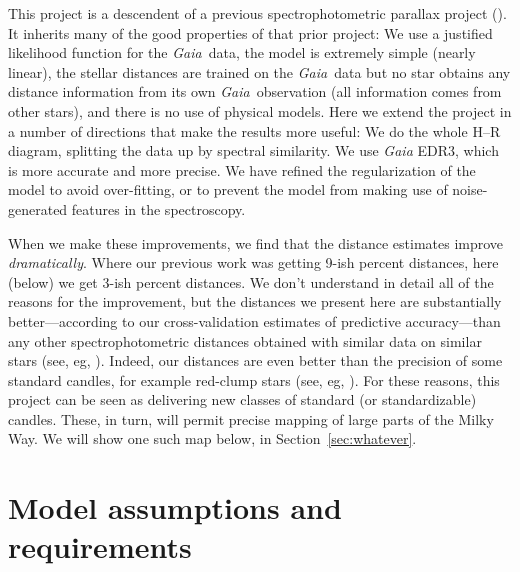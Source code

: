 \documentclass[modern]{aastex631}
\newcommand{\sectionname}{Section}
\newcommand{\acronym}[1]{{\small{#1}}}
\newcommand{\project}[1]{\textsl{#1}}
\newcommand{\Gaia}{\project{Gaia}}
\begin{document}
This project is a descendent of a previous spectrophotometric parallax project
(\citealt{her}).
It inherits many of the good properties of that prior project:
We use a justified likelihood function for the \Gaia\ data,
the model is extremely simple (nearly linear),
the stellar distances are trained on the \Gaia\ data but no star obtains
any distance information from its own \Gaia\ observation (all information
comes from other stars),
and there is no use of physical models.
Here we extend the project in a number of directions that make the results
more useful:
We do the whole H--R diagram, splitting the data up by spectral similarity.
We use \Gaia{} \acronym{EDR3}, which is more accurate and more precise.
We have refined the regularization of the model to avoid over-fitting, or to prevent
the model from making use of noise-generated features in the spectroscopy.

When we make these improvements, we find that the distance estimates improve
\emph{dramatically}.
Where our previous work was getting 9-ish percent distances, here (below) we
get 3-ish percent distances.
We don't understand in detail all of the reasons for the improvement, but the
distances we present here are substantially better---according to our
cross-validation estimates of predictive accuracy---than any other spectrophotometric
distances obtained with similar data on similar stars (see, eg, \citealt{foo, bar}).
Indeed, our distances are even better than the precision of some standard candles,
for example red-clump stars (see, eg, \citealt{whatever}).
For these reasons, this project can be seen as delivering new classes of standard
(or standardizable) candles.
These, in turn, will permit precise mapping of large parts of the Milky Way.
We will show one such map below, in \sectionname~\ref{sec:whatever}.

\section{Model assumptions and requirements}\label{sec:assumptions}
\end{document}
